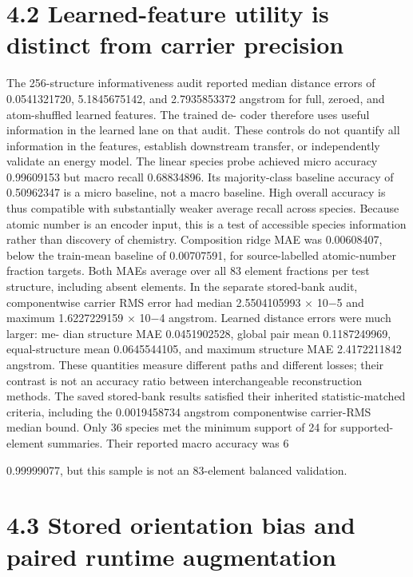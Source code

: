 \documentclass[11pt]{article}
\begin{document}
\section*{4.2 Learned-feature utility is distinct from carrier precision}

The 256-structure informativeness audit reported median distance errors of 0.0541321720, 5.1845675142,
and 2.7935853372 angstrom for full, zeroed, and atom-shuffled learned features. The trained de-
coder therefore uses useful information in the learned lane on that audit. These controls do not
quantify all information in the features, establish downstream transfer, or independently validate
an energy model.
The linear species probe achieved micro accuracy 0.99609153 but macro recall 0.68834896. Its
majority-class baseline accuracy of 0.50962347 is a micro baseline, not a macro baseline. High overall
accuracy is thus compatible with substantially weaker average recall across species. Because atomic
number is an encoder input, this is a test of accessible species information rather than discovery of
chemistry. Composition ridge MAE was 0.00608407, below the train-mean baseline of 0.00707591,
for source-labelled atomic-number fraction targets. Both MAEs average over all 83 element fractions
per test structure, including absent elements.
In the separate stored-bank audit, componentwise carrier RMS error had median 2.5504105993 \ensuremath{\times}
10\ensuremath{-}5 and maximum 1.6227229159 \ensuremath{\times} 10\ensuremath{-}4 angstrom. Learned distance errors were much larger: me-
dian structure MAE 0.0451902528, global pair mean 0.1187249969, equal-structure mean 0.0645544105,
and maximum structure MAE 2.4172211842 angstrom. These quantities measure different paths
and different losses; their contrast is not an accuracy ratio between interchangeable reconstruction
methods.
The saved stored-bank results satisfied their inherited statistic-matched criteria, including the
0.0019458734 angstrom componentwise carrier-RMS median bound. Only 36 species met the
minimum support of 24 for supported-element summaries. Their reported macro accuracy was
6

0.99999077, but this sample is not an 83-element balanced validation.

\section*{4.3 Stored orientation bias and paired runtime augmentation}
\end{document}
